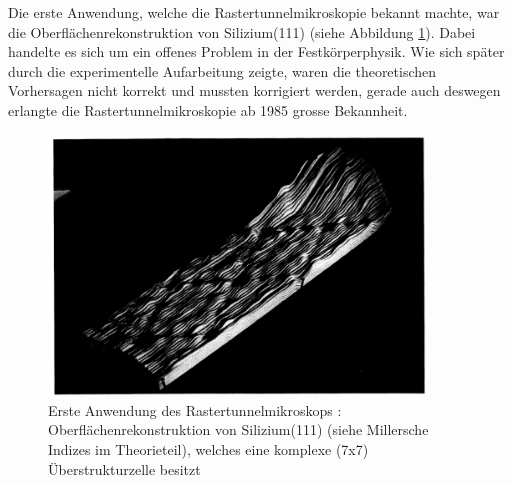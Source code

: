Die erste Anwendung, welche die Rastertunnelmikroskopie bekannt
machte, war die Oberflächenrekonstruktion von Silizium(111)  
\cite{binnig1983111} (siehe Abbildung \ref{fig:silicium}).
Dabei handelte es sich um ein offenes Problem in der
Festkörperphysik. Wie sich später durch die experimentelle
Aufarbeitung zeigte, waren die theoretischen Vorhersagen nicht 
korrekt und mussten korrigiert werden, gerade auch deswegen
erlangte die Rastertunnelmikroskopie ab 1985 grosse Bekannheit.
\begin{figure}
\includegraphics[width=10cm]{pics/silicium}
\caption{Erste Anwendung des Rastertunnelmikroskops 
\cite{binnig1983111}: 
Oberflächenrekonstruktion von Silizium(111) (siehe Millersche
Indizes im Theorieteil), welches eine komplexe (7x7) 
Überstrukturzelle besitzt}
 \label{fig:silicium}
\end{figure}

